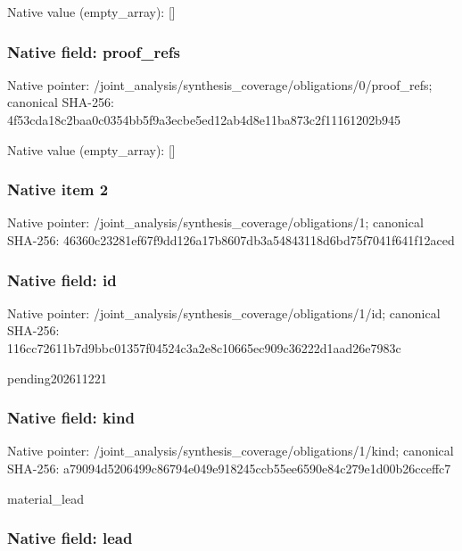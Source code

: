 \documentclass[10pt,a4paper]{article}
\begin{document}
Native value (empty\_array): []



\subsubsection{Native field: proof\_refs}


Native pointer: /joint\_analysis/synthesi\allowbreak{}s\_coverage/obligations/0\allowbreak{}/proof\_refs; canonical SHA-256: 4f53cda18c2baa0c0354bb5f\allowbreak{}9a3ecbe5ed12ab4d8e11ba87\allowbreak{}3c2f11161202b945



Native value (empty\_array): []



\subsubsection{Native item 2}


Native pointer: /joint\_analysis/synthesi\allowbreak{}s\_coverage/obligations/1; canonical SHA-256: 46360c23281ef67f9dd126a1\allowbreak{}7b8607db3a54843118d6bd75\allowbreak{}f7041f641f12aced



\subsubsection{Native field: id}


Native pointer: /joint\_analysis/synthesi\allowbreak{}s\_coverage/obligations/1\allowbreak{}/id; canonical SHA-256: 116cc72611b7d9bbc01357f0\allowbreak{}4524c3a2e8c10665ec909c36\allowbreak{}222d1aad26e7983c


pending202611221


\subsubsection{Native field: kind}


Native pointer: /joint\_analysis/synthesi\allowbreak{}s\_coverage/obligations/1\allowbreak{}/kind; canonical SHA-256: a79094d5206499c86794e049\allowbreak{}e918245ccb55ee6590e84c27\allowbreak{}9e1d00b26cceffc7


material\_lead


\subsubsection{Native field: lead}
\end{document}
